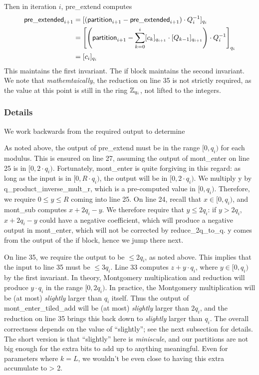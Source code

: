 \documentclass{article}
\begin{document}
Then in iteration $i$, \textsf{pre\_extend} computes
\begin{align}
    \mathsf{pre\_extended}_{i+1}&=\bracks{\parens{\mathsf{partition}_{i+1}-\mathsf{pre\_extended}_{i+1}}\cdot Q_i^{-1}}_{q_i}\\
    &=\bracks*{\parens*{\mathsf{partition}_{i+1}-\sum_{k=0}^i \bracks{c_k}_{q_{i+1}}\cdot\bracks{Q_{k-1}}_{q_{i+1}}}\cdot Q_i^{-1}}_{q_i} \\
    &=\bracks{c_i}_{q_i}
\end{align}
This maintains the first invariant. The \textsf{if} block maintains the second invariant. We note that \emph{mathemtaically}, the reduction on line 35 is not strictly required, as the value at this point is still in the ring $\Z_{q_i}$, not lifted to the integers.

\subsubsection{Details}
We work backwards from the required output to determine 

As noted above, the output of \textsf{pre\_extend} must be in the range $[0,q_i)$ for each modulus. This is ensured on line 27, assuming the output of \textsf{mont\_enter} on line 25 is in $[0, 2\cdot q_i)$. Fortunately, \textsf{mont\_enter} is quite forgiving in this regard: as long as the input is in $[0, R\cdot q_i)$, the output will be in $[0, 2\cdot q_i)$. We multiply \textsf{y} by \textsf{q\_product\_inverse\_mult\_r}, which is a pre-computed value in $[0, q_i)$. Therefore, we require $0\le y \le R$ coming into line 25. On line 24, recall that $x\in[0, q_i)$, and \textsf{mont\_sub} computes $x + 2q_i - y$. We therefore require that $y\le 2q_i$: if $y>2q_i$, $x + 2q_i - y$ could have a negative coefficient, which will produce a negative output in \textsf{mont\_enter}, which will not be corrected by \textsf{reduce\_2q\_to\_q}. \textsf{y} comes from the output of the \textsf{if} block, hence we jump there next.

On line 35, we require the output to be $\le 2q_i$, as noted above. This implies that the input to line 35 must be $\le 3q_i$. Line 33 computes $z+y\cdot q_i$, where $y\in [0,q_i)$ by the first invariant. In theory, Montgomery multiplication and reduction will produce $y\cdot q_i$ in the range $[0, 2q_i)$. In practice, the Montgomery multiplication will be (at most) \emph{slightly} larger than $q_i$ itself. Thus the output of \textsf{mont\_enter\_tiled\_add} will be (at most) \emph{slightly} larger than $2q_i$, and the reduction on line 35 brings this back down to \emph{slightly} larger than $q_i$. The overall correctness depends on the value of ``slightly''; see the next subsection for details. The short version is that ``slightly'' here is \emph{miniscule}, and our partitions are not big enough for the extra bits to add up to anything meaningful. Even for parameters where $k=L$, we wouldn't be even close to having this extra accumulate to > 2.
\end{document}

